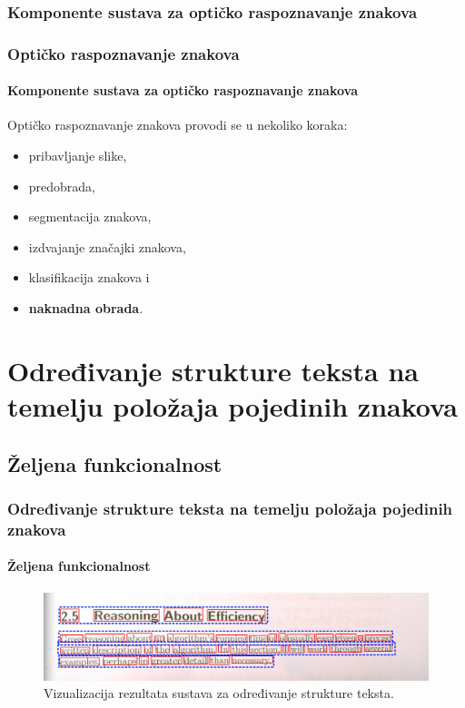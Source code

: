 \documentclass{beamer}
\begin{document}
\subsubsection{Komponente sustava za optičko raspoznavanje znakova}
\begin{frame}
\frametitle{Optičko raspoznavanje znakova}
\framesubtitle{Komponente sustava za optičko raspoznavanje znakova}
Optičko raspoznavanje znakova provodi se u nekoliko koraka:
\begin{itemize}
    \item pribavljanje slike,
    \item predobrada,
    \item segmentacija znakova,
    \item izdvajanje značajki znakova,
    \item klasifikacija znakova i
    \item \textbf{naknadna obrada}.
\end{itemize}
\end{frame}

\section{Određivanje strukture teksta na temelju položaja pojedinih znakova}
\subsection{Željena funkcionalnost}
\begin{frame}
\frametitle{Određivanje strukture teksta na temelju položaja pojedinih znakova}
\framesubtitle{Željena funkcionalnost}
\begin{figure}[htb]
    \centering
    \includegraphics[width=\textwidth]{images/text-segmentation-01.jpg}
    \caption{Vizualizacija rezultata sustava za određivanje strukture teksta.}
    \label{fig:text-segmentation-01}
\end{figure}
\end{frame}
\end{document}
